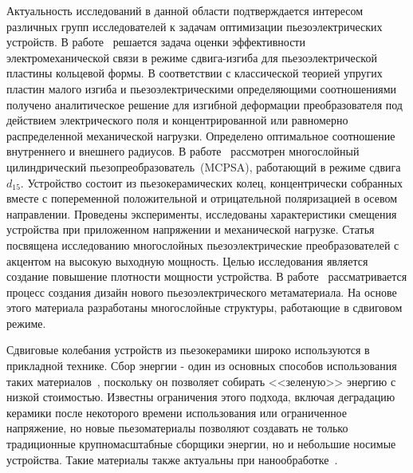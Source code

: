 Актуальность исследований в данной области подтверждается интересом различных групп исследователей к задачам оптимизации пьезоэлектрических устройств. В работе~\cite{Yu2016} решается задача оценки эффективности электромеханической связи в режиме сдвига-изгиба для пьезоэлектрической пластины кольцевой формы. В соответствии с классической теорией упругих пластин малого изгиба и пьезоэлектрическими определяющими соотношениями получено аналитическое решение для изгибной деформации преобразователя под действием электрического поля и концентрированной или равномерно распределенной механической нагрузки. Определено оптимальное соотношение внутреннего и внешнего радиусов. В работе~\cite{Gao2018} рассмотрен многослойный цилиндрический пьезопреобразователь~(MCPSA), работающий в режиме сдвига~$d_{15}$. Устройство состоит из пьезокерамических колец, концентрически собранных вместе с попеременной положительной и отрицательной поляризацией в осевом направлении. Проведены эксперименты, исследованы характеристики смещения устройства при приложенном напряжении и механической нагрузке. Статья~\cite{Yan2018} посвящена исследованию многослойных пьезоэлектрические преобразователей с акцентом на высокую выходную мощность. Целью исследования является создание повышение плотности мощности устройства. В работе~\cite{Yang2019} рассматривается процесс создания дизайн нового пьезоэлектрического метаматериала. На основе этого материала разработаны многослойные структуры, работающие в сдвиговом режиме.

Сдвиговые колебания устройств из пьезокерамики широко используются в прикладной технике. Сбор энергии - один из основных способов использования таких материалов~\cite{Mohanty2019, Elahi2018, Almanza2023}, поскольку он позволяет собирать <<зеленую>> энергию с низкой стоимостью. Известны ограничения этого подхода, включая деградацию керамики после некоторого времени использования или ограниченное напряжение, но новые пьезоматериалы позволяют создавать не только традиционные крупномасштабные сборщики энергии, но и небольшие носимые устройства. Такие материалы также актуальны при нанообработке~\cite{Xue2022}.

